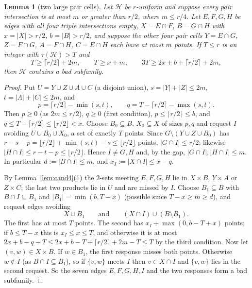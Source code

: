 \documentclass[11pt]{amsart}
\newtheorem{lemma}[theorem]{Lemma}
\theoremstyle{definition}
\theoremstyle{remark}
\newcommand{\cH}{\mathcal H}
\newcommand{\ceil}[1]{\lceil #1\rceil}
\newcommand{\floor}[1]{\lfloor #1\rfloor}
\begin{document}
\begin{lemma}[two large pair cells]\label{lem:L41}
Let $\cH$ be $r$-uniform and suppose every pair intersection is at most $m$ or greater than $r/2$, where $m\le r/4$. Let $E,F,G,H$ be edges with all four triple intersections empty, $X=E\cap F$, $B=G\cap H$ with $x=|X|>r/2$, $b=|B|>r/2$, and suppose the other four pair cells $Y=E\cap G$, $Z=F\cap G$, $A=F\cap H$, $C=E\cap H$ each have at most $m$ points. If $T\le r$ is an integer with $\tau(\cH)>T$ and
\[
T\ge\ceil{r/2}+2m,\qquad T\ge x+m,\qquad 3T\ge2x+b+\ceil{r/2}+2m,
\]
then $\cH$ contains a bad subfamily.
\end{lemma}
\begin{proof}
Put $U=Y\cup Z\cup A\cup C$ (a disjoint union), $s=|Y|+|Z|\le2m$, $t=|A|+|C|\le2m$, and
\[
p=\ceil{r/2}-\min(s,t),\qquad q=T-\ceil{r/2}-\max(s,t).
\]
Then $p\ge0$ (as $2m\le r/2$), $q\ge0$ (first condition), $p\le\ceil{r/2}\le b$, and $q\le T-\ceil{r/2}\le\floor{r/2}<x$. Choose $B_0\subseteq B$, $X_0\subseteq X$ of sizes $p,q$ and request $I$ avoiding $U\cup B_0\cup X_0$, a set of exactly $T$ points. Since $G\setminus(Y\cup Z\cup B_0)$ has $r-s-p=\floor{r/2}+\min(s,t)-s\le\floor{r/2}$ points, $|G\cap I|\le r/2$; likewise $|H\cap I|\le r-t-p\le\floor{r/2}$. Hence $I\ne G,H$ and, by the gap, $|G\cap I|,|H\cap I|\le m$. In particular $d:=|B\cap I|\le m$, and $x_I:=|X\cap I|\le x-q$.

By Lemma~\ref{lem:cand4}(1) the $2$-sets meeting $E,F,G,H$ lie in $X\times B$, $Y\times A$ or $Z\times C$; the last two products lie in $U$ and are missed by $I$. Choose $B_1\subseteq B$ with $B\cap I\subseteq B_1$ and $|B_1|=\min(b,T-x)$ (possible since $T-x\ge m\ge d$), and request edges avoiding
\[
X\cup B_1\qquad\text{and}\qquad (X\cap I)\cup(B\setminus B_1).
\]
The first has at most $T$ points. The second has $x_I+\max(0,b-T+x)$ points; if $b\le T-x$ this is $x_I\le x\le T$, and otherwise it is at most $2x+b-q-T\le 2x+b-T+\ceil{r/2}+2m-T\le T$ by the third condition. Now let $(v,w)\in X\times B$. If $w\in B_1$, the first response misses both points. Otherwise $w\notin I$ (as $B\cap I\subseteq B_1$), so if $\{v,w\}$ meets $I$ then $v\in X\cap I$ and $\{v,w\}$ lies in the second request. So the seven edges $E,F,G,H,I$ and the two responses form a bad subfamily.
\end{proof}
\end{document}
